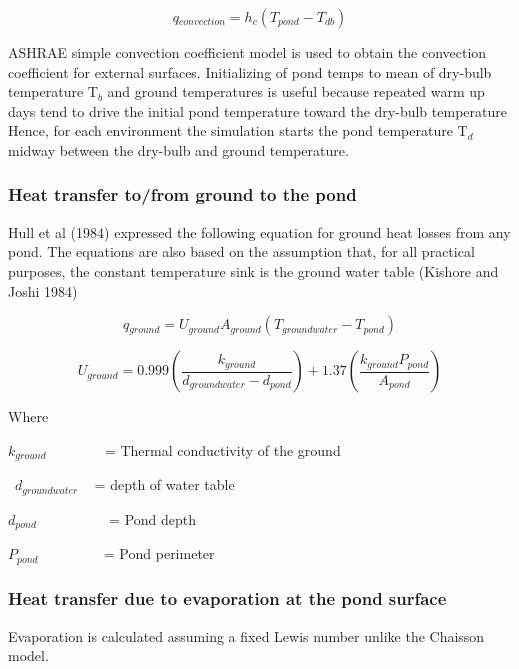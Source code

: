 \begin{equation}
q{}_{convection} = h{}_c(T{}_{pond} - T{}_{db})
\end{equation}

ASHRAE simple convection coefficient model is used to obtain the convection coefficient for external surfaces. Initializing of pond temps to mean of dry-bulb temperature T\(_{b}\) and ground temperatures is useful because repeated warm up days tend to drive the initial pond temperature toward the dry-bulb temperature Hence, for each environment the simulation starts the pond temperature T\(_{d}\) midway between the dry-bulb and ground temperature.

\subsubsection{Heat transfer to/from ground to the pond}\label{heat-transfer-tofrom-ground-to-the-pond}

Hull et al (1984) expressed the following equation for ground heat losses from any pond. The equations are also based on the assumption that, for all practical purposes, the constant temperature sink is the ground water table (Kishore and Joshi 1984)

\begin{equation}
q{}_{ground} = U{}_{ground}A{}_{ground}(T{}_{groundwater} - T{}_{pond})
\end{equation}

\begin{equation}
U{}_{ground} = 0.999\left( {\frac{{k{}_{ground}}}{{d{}_{groundwater} - d{}_{pond}}}} \right) + 1.37\left( {\frac{{k{}_{ground}P{}_{pond}}}{{A{}_{pond}}}} \right)
\end{equation}

Where

\(k{}_{ground}\) ~~~~~~~ = Thermal conductivity of the ground

~\(d{}_{groundwater}\) ~ = depth of water table

\(d{}_{pond}\) ~~~~~~~~~ = Pond depth

\(P{}_{pond}\) ~~~~~~~~ = Pond perimeter

\subsubsection{Heat transfer due to evaporation at the pond surface}\label{heat-transfer-due-to-evaporation-at-the-pond-surface}

Evaporation is calculated assuming a fixed Lewis number unlike the Chaisson model.

